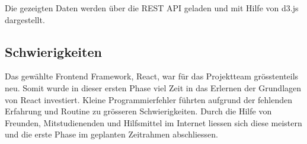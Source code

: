 Die gezeigten Daten werden über die \ac{REST} \ac{API} geladen und mit Hilfe von d3.js dargestellt.


\subsection{Schwierigkeiten}
Das gewählte Frontend Framework, React, war für das Projektteam grösstenteils neu.
Somit wurde in dieser ersten Phase viel Zeit in das Erlernen der Grundlagen von React investiert.
Kleine Programmierfehler führten aufgrund der fehlenden Erfahrung und Routine zu grösseren Schwierigkeiten.
Durch die Hilfe von Freunden, Mitstudienenden und Hilfsmittel im Internet liessen sich diese meistern 
und die erste Phase im geplanten Zeitrahmen abschliessen.

